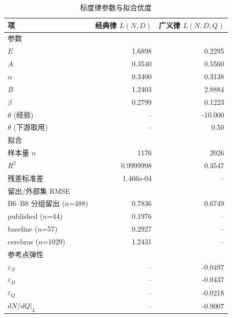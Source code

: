 \begin{table}[!htbp]
  \centering
  \caption{标度律参数与拟合优度}
  \label{tab:q2_scaling}
  \songti{}
  \begin{tabular}{lrr}
    \toprule
    项 & 经典律 $L(N,D)$ & 广义律 $L(N,D,Q)$ \\
    \midrule
    \multicolumn{3}{l}{参数} \\
    \quad $E$ & 1.6898 & 0.2295 \\
    \quad $A$ & 0.3540 & 0.5560 \\
    \quad $\alpha$ & 0.3400 & 0.3138 \\
    \quad $B$ & 1.2403 & 2.8884 \\
    \quad $\beta$ & 0.2799 & 0.1223 \\
    \quad $\theta$ (经验) & -- & -10.000 \\
    \quad $\theta$ (下游取用) & -- & 0.50 \\
    \midrule
    \multicolumn{3}{l}{拟合} \\
    \quad 样本量 $n$ & 1176 & 2026 \\
    \quad $R^2$ & 0.9999998 & 0.3547 \\
    \quad 残差标准差 & 1.466e-04 & -- \\
    \midrule
    \multicolumn{3}{l}{留出/外部集 RMSE} \\
    \quad B6--B8 分组留出 ($n$=488) & 0.7836 & 0.6749 \\
    \quad published ($n$=44) & 0.1976 & -- \\
    \quad baseline ($n$=57) & 0.2927 & -- \\
    \quad cerebras ($n$=1029) & 1.2431 & -- \\
    \midrule
    \multicolumn{3}{l}{参考点弹性} \\
    \quad $\varepsilon_N$ & -- & -0.0497 \\
    \quad $\varepsilon_D$ & -- & -0.0437 \\
    \quad $\varepsilon_Q$ & -- & -0.0218 \\
    \quad $dN/dQ|_L$ & -- & -0.9007 \\
    \bottomrule
  \end{tabular}
\end{table}
